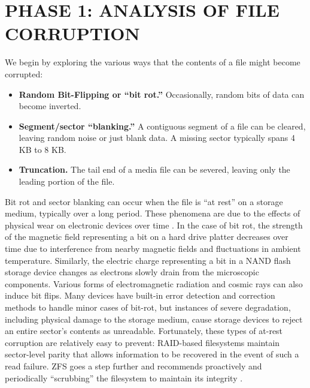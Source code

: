 %
%
%
%
%

\chapter{\uppercase{Phase 1: Analysis of File Corruption}}

We begin by exploring the various ways that the contents of a file might become corrupted:

\begin{itemize}
	\item \textbf{Random Bit-Flipping or ``bit rot.''} Occasionally, random bits of data can become inverted.
	\item \textbf{Segment/sector ``blanking.''} A contiguous segment of a file can be cleared, leaving random noise or just blank data. A missing sector typically spans 4 KB to 8 KB.
	\item \textbf{Truncation.} The tail end of a media file can be severed, leaving only the leading portion of the file.
\end{itemize}

Bit rot and sector blanking can occur when the file is ``at rest'' on a storage medium, typically over a long period. These phenomena are due to the effects of physical wear on electronic devices over time \cite{gibson1993}. In the case of bit rot, the strength of the magnetic field representing a bit on a hard drive platter decreases over time due to interference from nearby magnetic fields and fluctuations in ambient temperature. Similarly, the electric charge representing a bit in a NAND flash storage device changes as electrons slowly drain from the microscopic components. Various forms of electromagnetic radiation and cosmic rays can also induce bit flips. Many devices have built-in error detection and correction methods to handle minor cases of bit-rot, but instances of severe degradation, including physical damage to the storage medium, cause storage devices to reject an entire sector's contents as unreadable. Fortunately, these types of at-rest corruption are relatively easy to prevent: RAID-based filesystems maintain sector-level parity that allows information to be recovered in the event of such a read failure. ZFS goes a step further and recommends proactively and periodically ``scrubbing'' the filesystem to maintain its integrity \cite{zfs-scrub}.

